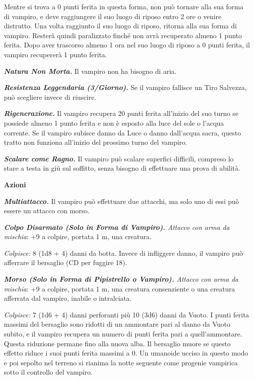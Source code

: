 \begin{multicols}{2}
Mentre si trova a 0 punti ferita in questa forma, non può tornare alla sua forma di vampiro, e deve raggiungere il suo luogo di riposo entro 2 ore o venire distrutto. Una volta raggiunto il suo luogo di riposo, ritorna alla sua forma di vampiro. Resterà quindi paralizzato finché non avrà recuperato almeno 1 punto ferita. Dopo aver trascorso almeno 1 ora nel suo luogo di riposo a 0 punti ferita, il vampiro recupererà 1 punto ferita.

\emph{\textbf{Natura Non Morta.}} Il vampiro non ha bisogno di aria.

\emph{\textbf{Resistenza Leggendaria (3/Giorno).}} Se il vampiro fallisce un Tiro Salvezza, può scegliere invece di riuscire.

\emph{\textbf{Rigenerazione.}} Il vampiro recupera 20 punti ferita all'inizio del suo turno se possiede almeno 1 punto ferita e non è esposto alla luce del sole o l'acqua corrente. Se il vampiro subisce danno da Luce o danno dall'acqua sacra, questo tratto non funziona all'inizio del prossimo turno del vampiro.

\emph{\textbf{Scalare come Ragno.}} Il vampiro può scalare superfici difficili, compreso lo stare a testa in giù sul soffitto, senza bisogno di effettuare una prova di abilità.

\textbf{Azioni}

\emph{\textbf{Multiattacco.}} Il vampiro può effettuare due attacchi, ma solo uno di essi può essere un attacco con morso.

\emph{\textbf{Colpo Disarmato (Solo in Forma di Vampiro).} Attacco con arma da mischia}: +9 a colpire, portata 1 m, una creatura.

\emph{Colpisce:} 8 (1d8 + 4) danni da botta. Invece di infliggere danno, il vampiro può afferrare il bersaglio (CD per fuggire 18).

\emph{\textbf{Morso (Solo in Forma di Pipistrello o Vampiro).} Attacco con arma da mischia}: +9 a colpire, portata 1 m, una creatura consenziente o una creatura afferrata dal vampiro, inabile o intralciata.

\emph{Colpisce:} 7 (1d6 + 4) danni perforanti più 10 (3d6) danni da Vuoto. I punti ferita massimi del bersaglio sono ridotti di un ammontare pari al danno da Vuoto subito, e il vampiro recupera un numero di punti ferita pari a quell'ammontare. Questa riduzione permane fino alla nuova alba. Il bersaglio muore se questo effetto riduce i suoi punti ferita massimi a 0. Un umanoide ucciso in questo modo e poi sepolto nel terreno si rianima la notte seguente come progenie vampirica sotto il controllo del vampiro.


\end{multicols}

